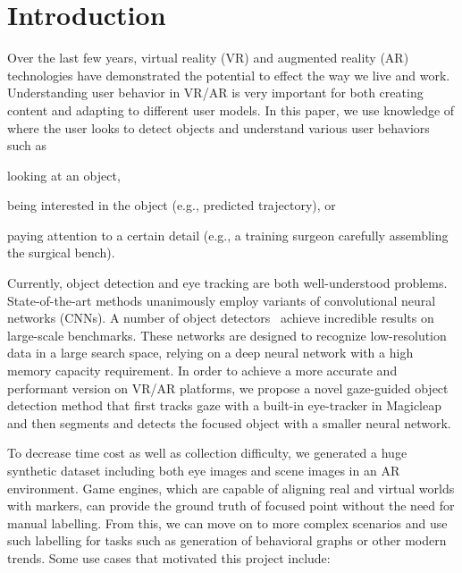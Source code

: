 \section{Introduction}

Over the last few years, virtual reality (VR) and augmented reality (AR)
technologies have demonstrated the potential to effect the way we live and work.
Understanding user behavior in VR/AR is very important for both creating
content and adapting to different user models. In this paper, we use
knowledge of where the user looks to detect objects and
understand various user behaviors such as
\begin{inlist}
\item looking at an object,
\item being interested in the object (e.g., predicted trajectory), or
\item
    paying attention to a certain detail (e.g., a training surgeon carefully
    assembling the surgical bench).
\end{inlist}

Currently, object detection and eye tracking are both well-understood problems.
State-of-the-art methods unanimously employ variants of convolutional neural
networks (CNNs). A number of object detectors~\cite{redmon2016you, liu2016ssd,
lin2017focal, girshick2014rich, girshick2015fast, ren2015faster, he2017mask}
achieve incredible results on large-scale benchmarks. These networks are
designed to recognize low-resolution data in a large search space, relying on a
deep neural network with a high memory capacity requirement. In order to achieve
a more accurate and performant version on VR/AR platforms, we propose a novel
gaze-guided object detection method that first tracks gaze with a built-in
eye-tracker in Magicleap and then segments and detects the focused object with a
smaller neural network.

To decrease time cost as well as collection difficulty, we generated a huge
synthetic dataset including both eye images and scene images in an AR
environment. Game engines, which are capable of aligning real and virtual worlds
with markers, can provide the ground truth of focused point without the need for
manual labelling. From this, we can move on to more complex scenarios and use
such labelling for tasks such as generation of behavioral graphs or other
modern trends. Some use cases that motivated this project include:


